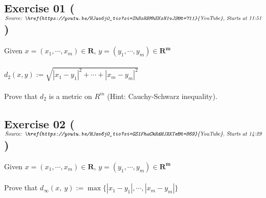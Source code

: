 \subsection*{Exercise 01 ($\textit{Source: \href{https://youtu.be/HJav6j0_tio?si=ZhBsRBMhEKsN1vJS&t=711}{YouTube}, Starts at 11:51}$)}

Given $x = (x_1, \cdots, x_m) \in \mathbf{R}$, $y = (y_1, \cdots, y_m) \in \mathbf{R^{m}}$ \\\\
$d_2(x, y) := \sqrt{|x_1 - y_1|^{2} + \cdots + |x_m - y_m|^{2}}$                           \\\\
Prove that $d_2$ is a metric on $R^m$ (Hint: Cauchy-Schwarz inequality).



\subsection*{Exercise 02 ($\textit{Source: \href{https://youtu.be/HJav6j0_tio?si=GS1FhwCkRdHJXKTe&t=869}{YouTube}, Starts at 14:29}$)}

Given $x = (x_1, \cdots, x_m) \in \mathbf{R}$, $y = (y_1, \cdots, y_m) \in \mathbf{R^{m}}$ \\\\
Prove that $d_{\infty}(x,\ y) := \max\{|x_1 - y_1|, \cdots, |x_m - y_m|\}$


